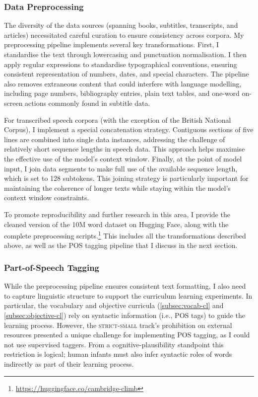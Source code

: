 \subsubsection{Data Preprocessing}
The diversity of the data sources (spanning books, subtitles, transcripts, and articles) necessitated careful curation to ensure consistency across corpora. My preprocessing pipeline implements several key transformations. First, I standardise the text through lowercasing and punctuation normalisation. I then apply regular expressions to standardise typographical conventions, ensuring consistent representation of numbers, dates, and special characters. The pipeline also removes extraneous content that could interfere with language modelling, including page numbers, bibliography entries, plain text tables, and one-word on-screen actions commonly found in subtitle data.

For transcribed speech corpora (with the exception of the British National Corpus), I implement a special concatenation strategy. Contiguous sections of five lines are combined into single data instances, addressing the challenge of relatively short sequence lengths in speech data. This approach helps maximise the effective use of the model's context window. Finally, at the point of model input, I join data segments to make full use of the available sequence length, which is set to 128 subtokens. This joining strategy is particularly important for maintaining the coherence of longer texts while staying within the model's context window constraints.

To promote reproducibility and further research in this area, I provide the cleaned version of the 10M word dataset on Hugging Face, along with the complete preprocessing scripts.\footnote{\url{https://huggingface.co/cambridge-climb}} This includes all the transformations described above, as well as the POS tagging pipeline that I discuss in the next section.

\subsubsection{Part-of-Speech Tagging}

While the preprocessing pipeline ensures consistent text formatting, I also need to capture linguistic structure to support the curriculum learning experiments. In particular, the vocabulary and objective curricula (\cref{subsec:vocab-cl} and \cref{subsec:objective-cl}) rely on syntactic information (i.e., POS tags) to guide the learning process. However, the \textsc{strict-small} track's prohibition on external resources presented a unique challenge for implementing POS tagging, as I could not use supervised taggers. From a cognitive-plausibility standpoint this restriction is logical; human infants must also infer syntactic roles of words indirectly as part of their learning process.

